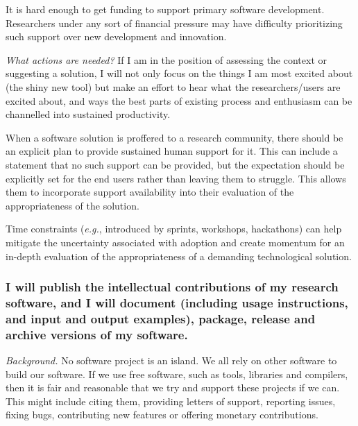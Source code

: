 \documentclass[a4paper,UKenglish]{dagman}
\renewcommand{\paragraph}[1]{\subsubsection*{#1}\xspace}
\newcommand{\eg}{\emph{e.g.},\xspace}
\begin{document}
It is hard enough to get funding to support primary software development. Researchers under any sort of financial pressure may have difficulty prioritizing such support over new development and innovation.

\emph{What actions are needed?}
If I am in the position of assessing the context or suggesting a solution, I will not only focus on the things I am most excited about (the shiny new tool) but make an effort to hear what the researchers/users are excited about, and ways the best parts of existing process and enthusiasm can be channelled into sustained productivity.

When a software solution is proffered to a research community, there should be an explicit plan to provide sustained human support for it. This can include a statement that no such support can be provided, but the expectation should be explicitly set for the end users rather than leaving them to struggle. This allows them to incorporate support availability into their evaluation of the appropriateness of the solution.


Time constraints (\eg introduced by sprints, workshops, hackathons) can help mitigate the uncertainty associated with adoption and create momentum for an in-depth evaluation of the appropriateness of a demanding technological solution.

\paragraph{I will publish the intellectual contributions of my research software, and I will document (including usage instructions, and input and output examples), package, release and archive versions of my software.}

\emph{Background.}
No software project is an island. We all rely on other software to build our software. If we use free software, such as tools, libraries and compilers, then it is fair and reasonable that we try and support these projects if we can. This might include citing them, providing letters of support, reporting issues, fixing bugs, contributing new features or offering monetary contributions.
\end{document}
